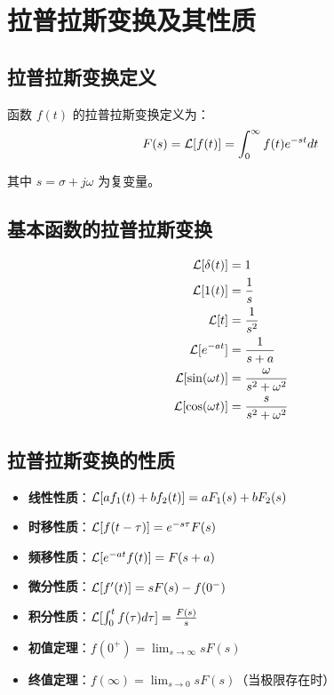 \section{拉普拉斯变换及其性质}

\subsection{拉普拉斯变换定义}
函数 $f(t)$ 的拉普拉斯变换定义为：
\[F(s) = \mathcal{L}[f(t)] = \int_0^{\infty} f(t)e^{-st} dt\]

其中 $s = \sigma + j\omega$ 为复变量。

\subsection{基本函数的拉普拉斯变换}
\begin{align}
\mathcal{L}[\delta(t)] &= 1 \\
\mathcal{L}[1(t)] &= \frac{1}{s} \\
\mathcal{L}[t] &= \frac{1}{s^2} \\
\mathcal{L}[e^{-at}] &= \frac{1}{s+a} \\
\mathcal{L}[\sin(\omega t)] &= \frac{\omega}{s^2+\omega^2} \\
\mathcal{L}[\cos(\omega t)] &= \frac{s}{s^2+\omega^2}
\end{align}

\subsection{拉普拉斯变换的性质}
\begin{itemize}
    \item \textbf{线性性质}：$\mathcal{L}[af_1(t) + bf_2(t)] = aF_1(s) + bF_2(s)$
    \item \textbf{时移性质}：$\mathcal{L}[f(t-\tau)] = e^{-s\tau}F(s)$
    \item \textbf{频移性质}：$\mathcal{L}[e^{-at}f(t)] = F(s+a)$
    \item \textbf{微分性质}：$\mathcal{L}[f'(t)] = sF(s) - f(0^-)$
    \item \textbf{积分性质}：$\mathcal{L}[\int_0^t f(\tau)d\tau] = \frac{F(s)}{s}$
    \item \textbf{初值定理}：$f(0^+) = \lim_{s \to \infty} sF(s)$
    \item \textbf{终值定理}：$f(\infty) = \lim_{s \to 0} sF(s)$（当极限存在时）
\end{itemize}
